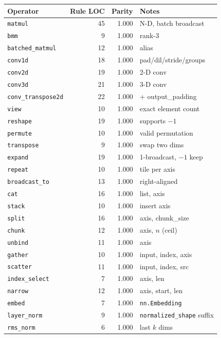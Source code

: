 \begin{table}[h]
\centering
\small
\setlength{\tabcolsep}{4pt}
\begin{tabular}{lrrl}
\toprule
Operator & Rule LOC & Parity & Notes \\
\midrule
\texttt{matmul} & 45 & 1.000 & N-D, batch broadcast \\
\texttt{bmm} & 9 & 1.000 & rank-3 \\
\texttt{batched\_matmul} & 12 & 1.000 & alias \\
\texttt{conv1d} & 18 & 1.000 & pad/dil/stride/groups \\
\texttt{conv2d} & 19 & 1.000 & 2-D conv \\
\texttt{conv3d} & 21 & 1.000 & 3-D conv \\
\texttt{conv\_transpose2d} & 22 & 1.000 & + output\_padding \\
\texttt{view} & 10 & 1.000 & exact element count \\
\texttt{reshape} & 19 & 1.000 & supports $-1$ \\
\texttt{permute} & 10 & 1.000 & valid permutation \\
\texttt{transpose} & 9 & 1.000 & swap two dims \\
\texttt{expand} & 19 & 1.000 & 1-broadcast, $-1$ keep \\
\texttt{repeat} & 10 & 1.000 & tile per axis \\
\texttt{broadcast\_to} & 13 & 1.000 & right-aligned \\
\texttt{cat} & 16 & 1.000 & list, axis \\
\texttt{stack} & 10 & 1.000 & insert axis \\
\texttt{split} & 16 & 1.000 & axis, chunk\_size \\
\texttt{chunk} & 12 & 1.000 & axis, $n$ (ceil) \\
\texttt{unbind} & 11 & 1.000 & axis \\
\texttt{gather} & 10 & 1.000 & input, index, axis \\
\texttt{scatter} & 11 & 1.000 & input, index, src \\
\texttt{index\_select} & 7 & 1.000 & axis, len \\
\texttt{narrow} & 12 & 1.000 & axis, start, len \\
\texttt{embed} & 7 & 1.000 & \texttt{nn.Embedding} \\
\texttt{layer\_norm} & 9 & 1.000 & \texttt{normalized\_shape} suffix \\
\texttt{rms\_norm} & 6 & 1.000 & last $k$ dims \\

\end{tabular}
\end{table}
